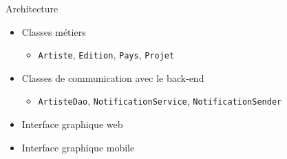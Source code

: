 \documentclass{beamer}
\begin{document}
\begin{frame}{Architecture}

\begin{itemize}
    \item Classes métiers
    \begin{itemize}
        \item \texttt{Artiste}, \texttt{Edition}, \texttt{Pays}, \texttt{Projet}
    \end{itemize}
    \item Classes de communication avec le back-end
    \begin{itemize}
        \item \texttt{ArtisteDao}, \texttt{NotificationService},
        \texttt{NotificationSender}
    \end{itemize}
    \item Interface graphique web
    \item Interface graphique mobile
\end{itemize}
\end{frame}
\end{document}
